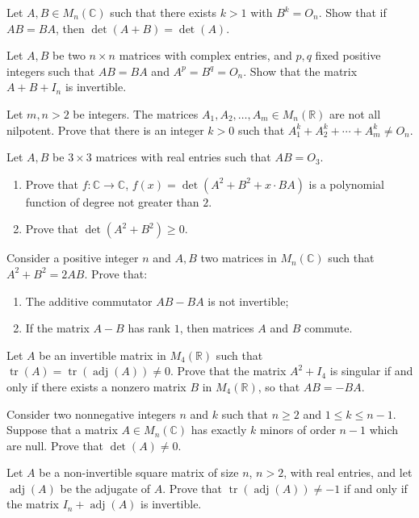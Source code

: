 \documentclass[12pt]{article}
\begin{document}
\begin{problems}
\item Let $A,B\in M_n(\mathbb{C})$ such that there exists $k>1$ with $B^k=O_n$. Show that if $AB=BA$, then $\det(A+B)=\det(A)$.

\item Let $A,B$ be two $n\times n$ matrices with complex entries, and $p,q$ fixed positive integers such that $AB=BA$ and $A^p=B^q=O_n$. Show that the matrix $A+B+I_n$ is invertible.

\item Let $m,n>2$ be integers. The matrices $A_1,A_2,\dots,A_m\in M_n(\mathbb{R})$ are not all nilpotent. Prove that there is an integer $k>0$ such that $A_1^k+A_2^k+\cdots+A_m^k \ne O_n$.

\item Let $A,B$ be $3\times 3$ matrices with real entries such that $AB=O_3$.
\begin{enumerate}[label=(\alph*)]
\item Prove that $f:\mathbb{C}\to\mathbb{C}$, $f(x)=\det(A^2+B^2+x\cdot BA)$ is a polynomial function of degree not greater than $2$.
\item Prove that $\det(A^2+B^2)\ge 0$.
\end{enumerate}

\item Consider a positive integer $n$ and $A,B$ two matrices in $M_n(\mathbb{C})$ such that $A^2+B^2=2AB$. Prove that:
\begin{enumerate}[label=(\alph*)]
\item The additive commutator $AB-BA$ is not invertible;
\item If the matrix $A-B$ has rank $1$, then matrices $A$ and $B$ commute.
\end{enumerate}

\item Let $A$ be an invertible matrix in $M_4(\mathbb{R})$ such that $\operatorname{tr}(A)=\operatorname{tr}(\operatorname{adj}(A))\ne 0$. Prove that the matrix $A^2+I_4$ is singular if and only if there exists a nonzero matrix $B$ in $M_4(\mathbb{R})$, so that $AB=-BA$.

\item Consider two nonnegative integers $n$ and $k$ such that $n\ge 2$ and $1\le k\le n-1$. Suppose that a matrix $A\in M_n(\mathbb{C})$ has exactly $k$ minors of order $n-1$ which are null. Prove that $\det(A)\ne 0$.

\item Let $A$ be a non-invertible square matrix of size $n$, $n>2$, with real entries, and let $\operatorname{adj}(A)$ be the adjugate of $A$. Prove that $\operatorname{tr}(\operatorname{adj}(A)) \ne -1$ if and only if the matrix $I_n+\operatorname{adj}(A)$ is invertible.


\end{problems}
\end{document}
